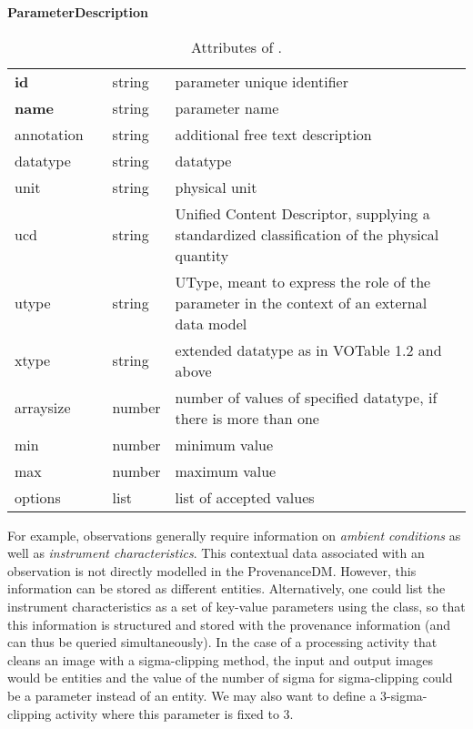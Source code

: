 \begin{table}[ht]
\small
{}\textwidth
\textbf{\normalsize ParameterDescription}\vspace{0.25em}\\
\begin{tabulary}{1.0\textwidth}{@{}p{0cm}p{2.5cm}lL@{}}
\toprule
{} & \head{} &  & \\
\midrule
\textbf{id}  & & string & parameter unique identifier\\
\textbf{name} & & string & parameter name\\
annotation & & string & additional free text description\\
datatype    & & string & datatype \\
unit           & & string & physical unit \\
ucd           & & string  & Unified Content Descriptor, supplying a standardized classification of the physical quantity\\
utype        & & string  & UType, meant to express the role of the parameter in the context of an external data model \\
xtype         & & string & extended datatype as in VOTable 1.2 and above\\
arraysize     & & number & number of values of specified datatype, if there is more than one\\
min           & & number & minimum value \\
max           & & number & maximum value\\
options           & & list & list of accepted values\\
\bottomrule
\end{tabulary}
\caption[Attributes of ]{Attributes of .}
\end{table}

For example, observations generally require information on \emph{ambient conditions} as well as 
\emph{instrument characteristics}. This contextual data associated with an observation is not directly modelled in the ProvenanceDM. However, this information can be stored as different entities. Alternatively, one could list the instrument characteristics as a set of key-value parameters using the  class, so that this information is structured and stored with the provenance information (and can thus be queried simultaneously). In the case of a processing activity that cleans an image with a sigma-clipping method, the input and output images would be entities and the value of the number of sigma for sigma-clipping could be a parameter instead of an entity. We may also want to define a 3-sigma-clipping activity where this parameter is fixed to 3.


